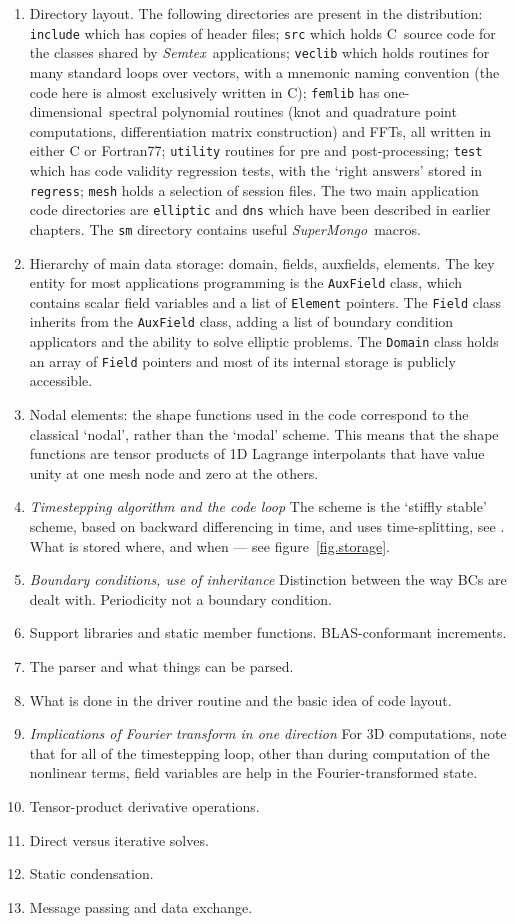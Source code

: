 \documentclass[11pt]{report}
\newcommand{\Semtex}{\emph{Semtex}} \newcommand{\Dog}{\emph{Dog}}
\newcommand{\SM}{\emph{SuperMongo}}
\newcommand\oned{one-di\-men\-sion\-al}
\newcommand\cpp{C\nolinebreak\hspace{-.05em}\raisebox{.3ex}{\footnotesize\bf
+}\nolinebreak\hspace{-.10em}\raisebox{.3ex}{\footnotesize\bf+}}
\begin{document}
\begin{enumerate}
\item
Directory layout.  The following directories are present in the
distribution: \verb|include| which has copies of header files;
\verb|src| which holds \cpp\ source code for the classes shared by
\Semtex\ applications; \verb|veclib| which holds routines for many
standard loops over vectors, with a mnemonic naming convention (the
code here is almost exclusively written in C); \verb|femlib| has
\oned\ spectral polynomial routines (knot and quadrature point
computations, differentiation matrix construction) and FFTs, all
written in either C or Fortran77; \verb|utility| routines for pre and
post-processing; \verb|test| which has code validity regression tests,
with the `right answers' stored in \verb|regress|; \verb|mesh| holds a
selection of session files.  The two main application code
directories are \verb|elliptic| and \verb|dns| which
have been described in earlier chapters.  The \verb|sm| directory
contains useful \SM\ macros.
\item
Hierarchy of main data storage: domain, fields, auxfields,
elements. The key entity for most applications programming is the
\verb|AuxField| class, which contains scalar field variables and a
list of \verb|Element| pointers.  The \verb|Field| class inherits from
the \verb|AuxField| class, adding a list of boundary condition
applicators and the ability to solve elliptic problems.  The
\verb|Domain| class holds an array of \verb|Field| pointers and most
of its internal storage is publicly accessible.
\item
Nodal elements: the shape functions used in the code correspond to the
classical `nodal', rather than the `modal' scheme. This means that the
shape functions are tensor products of 1D Lagrange interpolants that
have value unity at one mesh node and zero at the others.
\item
\textsl{Timestepping algorithm and the code loop} The scheme is the `stiffly
stable' scheme, based on backward differencing in time, and uses
time-splitting, see \citet{kio91}. What is stored where, and when ---
see figure~\ref{fig.storage}.
\item
\textsl{Boundary conditions, use of inheritance} Distinction between
the way BCs are dealt with. Periodicity not a boundary condition.
\item
Support libraries and static member functions. BLAS-conformant increments.
\item
The parser and what things can be parsed.
\item
What is done in the driver routine and the basic idea of code layout.
\item
\textsl{Implications of Fourier transform in one direction} For 3D
computations, note that for all of the timestepping loop, other than
during computation of the nonlinear terms, field variables are help in
the Fourier-transformed state.
\item
Tensor-product derivative operations.
\item
Direct versus iterative solves.
\item
Static condensation.
\item
Message passing and data exchange.
\end{enumerate}
\end{document}
